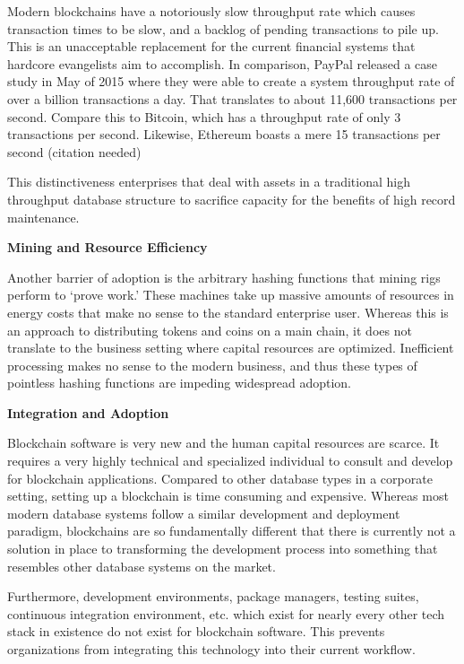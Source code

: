 \documentclass{article}
\begin{document}
Modern blockchains have a notoriously slow throughput rate which causes transaction times to be slow, and a backlog of pending transactions to pile up. This is an unacceptable replacement for the current financial systems that hardcore evangelists aim to accomplish. In comparison, PayPal released a case study in May of 2015 where they were able to create a system throughput rate of over a billion transactions a day. That translates to about 11,600 transactions per second. Compare this to Bitcoin, which has a throughput rate of only 3 transactions per second. Likewise, Ethereum boasts a mere 15 transactions per second (citation needed)

This distinctiveness enterprises that deal with assets in a traditional high throughput database structure to sacrifice capacity for the benefits of high record maintenance.

\begin{center}
\textbf{Mining and Resource Efficiency}
\end{center}

Another barrier of adoption is the arbitrary hashing functions that mining rigs perform to ‘prove work.’ These machines take up massive amounts of resources in energy costs that make no sense to the standard enterprise user. Whereas this is an approach to distributing tokens and coins on a main chain, it does not translate to the business setting where capital resources are optimized. Inefficient processing makes no sense to the modern business, and thus these types of pointless hashing functions are impeding widespread adoption.

\begin{center}
\textbf{Integration and Adoption}
\end{center}
Blockchain software is very new and the human capital resources are scarce. It requires a very highly technical and specialized individual to consult and develop for blockchain applications. Compared to other database types in a corporate setting, setting up a blockchain is time consuming and expensive. Whereas most modern database systems follow a similar development and deployment paradigm, blockchains are so fundamentally different that there is currently not a solution in place to transforming the development process into something that resembles other database systems on the market.

Furthermore, development environments, package managers, testing suites, continuous integration environment, etc. which exist for nearly every other tech stack in existence do not exist for blockchain software. This prevents organizations from integrating this technology into their current workflow.
\end{document}
